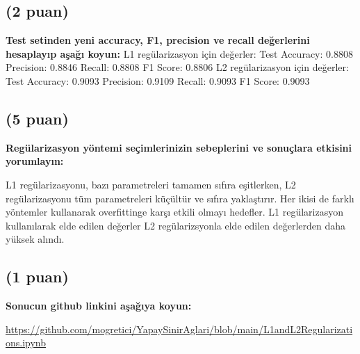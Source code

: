 \documentclass[11pt]{article}
\begin{document}
\subsection{(2 puan)} \textbf{Test setinden yeni accuracy, F1, precision ve recall değerlerini hesaplayıp aşağı koyun:}
\newline
L1 regülarizasyon için değerler: \newline
Test Accuracy: 0.8808
Precision: 0.8846
Recall: 0.8808
F1 Score: 0.8806
\newline
\newline
L2 regülarizasyon için değerler: \newline
Test Accuracy: 0.9093
Precision: 0.9109
Recall: 0.9093
F1 Score: 0.9093

\subsection{(5 puan)} \textbf{Regülarizasyon yöntemi seçimlerinizin sebeplerini ve sonuçlara etkisini yorumlayın:}

 L1 regülarizasyonu, bazı parametreleri tamamen sıfıra eşitlerken, L2 regülarizasyonu tüm parametreleri küçültür ve sıfıra yaklaştırır. Her ikisi de farklı yöntemler kullanarak overfittinge karşı etkili olmayı hedefler. L1 regülarizasyon kullanılarak elde edilen değerler L2 regülarizsyonla elde edilen değerlerden daha yüksek alındı.

\subsection{(1 puan)} \textbf{Sonucun github linkini  aşağıya koyun:}

\url{https://github.com/mogretici/YapaySinirAglari/blob/main/L1andL2Regularizations.ipynb}
\end{document}
